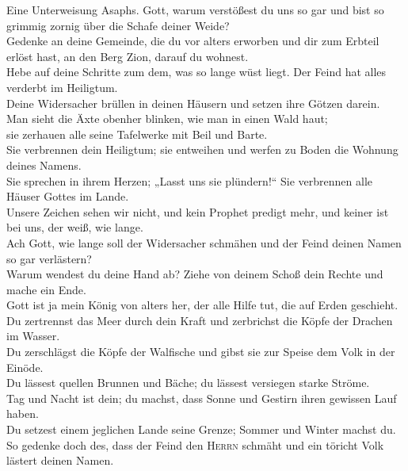  Eine Unterweisung Asaphs. Gott, warum verstößest du uns
so gar und bist so grimmig zornig über die Schafe deiner Weide?\\
 Gedenke an deine Gemeinde, die du vor alters erworben und
dir zum Erbteil erlöst hast, an den Berg Zion, darauf du wohnest.\\
 Hebe auf deine Schritte zum dem, was so lange wüst liegt.
Der Feind hat alles verderbt im Heiligtum.\\
 Deine Widersacher brüllen in deinen Häusern und setzen
ihre Götzen darein.\\
 Man sieht die Äxte obenher blinken, wie man in einen Wald
haut;\\
 sie zerhauen alle seine Tafelwerke mit Beil und Barte.\\
 Sie verbrennen dein Heiligtum; sie entweihen und werfen
zu Boden die Wohnung deines Namens.\\
 Sie sprechen in ihrem Herzen; „Lasst uns sie
plündern!{}`` Sie verbrennen alle Häuser Gottes im Lande.\\
 Unsere Zeichen sehen wir nicht, und kein Prophet predigt
mehr, und keiner ist bei uns, der weiß, wie lange.\\
 Ach Gott, wie lange soll der Widersacher schmähen und
der Feind deinen Namen so gar verlästern?\\
 Warum wendest du deine Hand ab? Ziehe von deinem Schoß
dein Rechte und mache ein Ende.\\
 Gott ist ja mein König von alters her, der alle Hilfe
tut, die auf Erden geschieht.\\
 Du zertrennst das Meer durch dein Kraft und zerbrichst
die Köpfe der Drachen im Wasser.\\
 Du zerschlägst die Köpfe der Walfische und gibst sie zur
Speise dem Volk in der Einöde.\\
 Du lässest quellen Brunnen und Bäche; du lässest
versiegen starke Ströme.\\
 Tag und Nacht ist dein; du machst, dass Sonne und
Gestirn ihren gewissen Lauf haben.\\
 Du setzest einem jeglichen Lande seine Grenze; Sommer
und Winter machst du.\\
 So gedenke doch des, dass der Feind den \textsc{Herrn}
schmäht und ein töricht Volk lästert deinen Namen.\\
